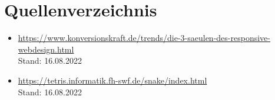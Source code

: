 \documentclass[a4paper,12pt]{scrartcl}
\begin{document}
\newpage

\section{Quellenverzeichnis}

\begin{itemize}
\item \url{https://www.konversionskraft.de/trends/die-3-saeulen-des-responsive-webdesign.html} \\ Stand: 16.08.2022
\item \url {https://tetris.informatik.fh-swf.de/snake/index.html} \\ Stand: 16.08.2022
\end{itemize}
\end{document}
